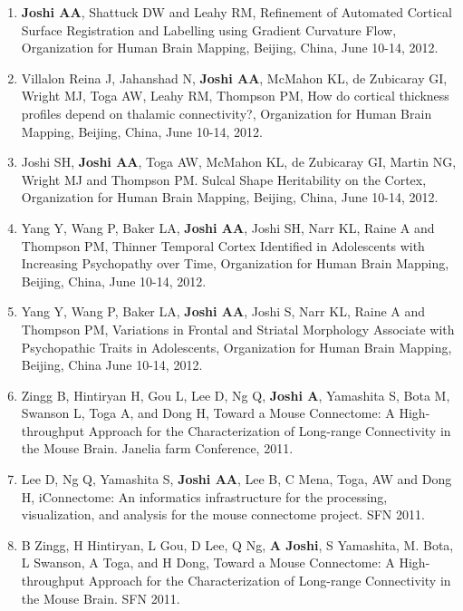 \documentclass[overlapped,line,letterpaper]{res}
\begin{document}
\begin{resume}
\begin{enumerate}
    \item \textbf{Joshi AA}, Shattuck DW and Leahy RM, {Refinement of Automated Cortical Surface Registration and Labelling using Gradient Curvature Flow}, Organization for Human Brain Mapping, Beijing, China, June 10-14, 2012.

    \item Villalon Reina J, Jahanshad N, \textbf{Joshi AA}, McMahon KL, de Zubicaray GI, Wright MJ, Toga AW, Leahy RM, Thompson PM, {How do cortical thickness profiles depend on thalamic connectivity?}, Organization for Human Brain Mapping, Beijing, China, June 10-14, 2012.

    \item Joshi SH, \textbf{Joshi AA}, Toga AW, McMahon KL, de Zubicaray GI, Martin NG, Wright MJ and Thompson PM. {Sulcal Shape Heritability on the Cortex}, Organization for Human Brain Mapping, Beijing, China, June 10-14, 2012.

    \item Yang Y, Wang P, Baker LA, \textbf{Joshi AA}, Joshi SH, Narr KL, Raine A and Thompson PM, {Thinner Temporal Cortex Identified in Adolescents with Increasing Psychopathy over Time}, Organization for Human Brain Mapping, Beijing, China, June 10-14, 2012.

    \item Yang Y, Wang P, Baker LA, \textbf{Joshi AA}, Joshi S, Narr KL, Raine A and Thompson PM, {Variations in Frontal and Striatal Morphology Associate with Psychopathic Traits in Adolescents}, Organization for Human Brain Mapping, Beijing, China June 10-14, 2012.

    \item Zingg B, Hintiryan H, Gou L, Lee D, Ng Q, \textbf{Joshi A}, Yamashita S, Bota M, Swanson L, Toga A, and Dong H, {Toward a Mouse Connectome: A High-throughput Approach for the Characterization of Long-range Connectivity in the Mouse Brain}. Janelia farm Conference, 2011.

    \item Lee D, Ng Q, Yamashita S, \textbf{Joshi AA}, Lee B, C Mena, Toga, AW and Dong H, {iConnectome: An informatics infrastructure for the processing, visualization, and analysis for the mouse connectome project}. SFN 2011.

    \item B Zingg, H Hintiryan, L Gou, D Lee, Q Ng, \textbf{A Joshi}, S Yamashita, M. Bota, L Swanson, A Toga, and H Dong, {Toward a Mouse Connectome: A High-throughput Approach for the Characterization of Long-range Connectivity in the Mouse Brain}. SFN 2011.


\end{enumerate}
\end{resume}
\end{document}

